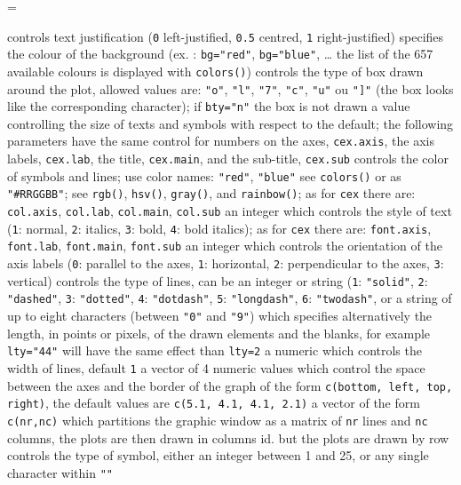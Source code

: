 \documentclass[10pt,landscape]{article}
\newcommand{\code}{\texttt}
\begin{document}
\begin{multicols*}{3}
\everypar={\hangindent=9mm}

  controls text justification (\code{0} left-justified, \code{0.5} centred, \code{1}	{right-justified)}
  specifies the colour of the background (ex. : \code{bg="red"}, \code{bg="blue"}, \ldots{}	{the list of the 657 available colours is displayed with \code{colors()})}
  controls the type of box drawn around the plot, allowed values are: \code{"o"}, \code{"l"}, \code{"7"}, \code{"c"}, \code{"u"} ou \code{"]"} (the box looks like the corresponding character); if \code{bty="n"}	{the box is not drawn}
	{ a value controlling the size of texts and symbols with respect to the default; the following parameters have the same control for numbers on the axes, \code{cex.axis}, the axis labels, \code{cex.lab}, the title, \code{cex.main}, and the sub-title, \code{cex.sub}}
  controls the color of symbols and lines; use color names: \code{"red"}, \code{"blue"} see \code{colors()} or as \code{"\#RRGGBB"}; see \code{rgb()}, \code{hsv()}, \code{gray()}, and \code{rainbow()}; as for \code{cex}	{there are: \code{col.axis}, \code{col.lab}, \code{col.main}, \code{col.sub}}
  an integer which controls the style of text (\code{1}: normal, \code{2}: italics, \code{3}: bold, \code{4}: bold italics); as for \code{cex}	{there are: \code{font.axis}, \code{font.lab}, \code{font.main}, \code{font.sub}}
	{ an integer which controls the orientation of the axis labels (\code{0}: parallel to the axes, \code{1}: horizontal, \code{2}: perpendicular to the axes, \code{3}: vertical)}
  controls the type of lines, can be an integer or string (\code{1}: \code{"solid"}, \code{2}: \code{"dashed"}, \code{3}: \code{"dotted"}, \code{4}: \code{"dotdash"}, \code{5}: \code{"longdash"}, \code{6}: \code{"twodash"}, or a string of up to eight characters (between \code{"0"} and \code{"9"}) which specifies alternatively the length, in points or pixels, of the drawn elements and the blanks, for example \code{lty="44"}	{will have the same effect than \code{lty=2}}
	{ a numeric which controls the width of lines, default \code{1}}
	{ a vector of 4 numeric values which control the space between the axes and the border of the graph of the form \code{c(bottom, left, top, right)}, the default values are \code{c(5.1, 4.1, 4.1, 2.1)}}
  a vector of the form \code{c(nr,nc)} which partitions the graphic window as a matrix of \code{nr} lines and \code{nc}	{columns, the plots are then drawn in columns}
	{ id. but the plots are drawn by row}
	{ controls the type of symbol, either an integer between 1 and 25, or any single character within \code{""}}


\end{multicols*}
\end{document}
